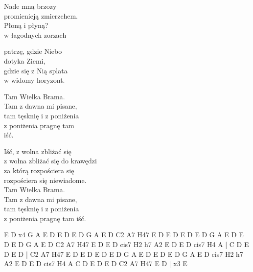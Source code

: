 \begin{textn}
    \chordfill
    Nade mną brzozy\\
    promienieją zmierzchem.\\
    Płoną i płyną?\\
    w łagodnych zorzach

    patrzę, gdzie Niebo\\
    dotyka Ziemi,\\
    gdzie się z Nią splata\\
    w widomy horyzont.

    Tam Wielka Brama.\\
    Tam z dawna mi pisane,\\
    tam tęsknię i z poniżenia\\
    z poniżenia pragnę tam\\
    iść.

    Iść, z wolna zbliżać się\\
    z wolna zbliżać się do krawędzi\\
    za którą rozpościera się\\
    rozpościera się niewiadome.\\
    Tam Wielka Brama.\\
    Tam z dawna mi pisane,\\
    tam tęsknię i z poniżenia\\
    z poniżenia pragnę tam
    iść.
\end{textn}
\begin{chordw}
    E D x4
    G A E D
    E D E D
    G A E D
    C2 A7 H47 E D E D
    E D E D
    G A E D
    E D E D
    G A E D
    C2 A7 H47 E D E D
    cis7 H2
    h7 A2 E D E D
    cis7 H4 A | C D
    E D E D	|
    C2 A7 H47 E D E D
    E D E D
    G A E D
    E D E D
    G A E D
    cis7 H2
    h7 A2 E D E D
    cis7 H4 A
    C D
    E D E D
    C2 A7 H47 E D | x3
    E
\end{chordw}